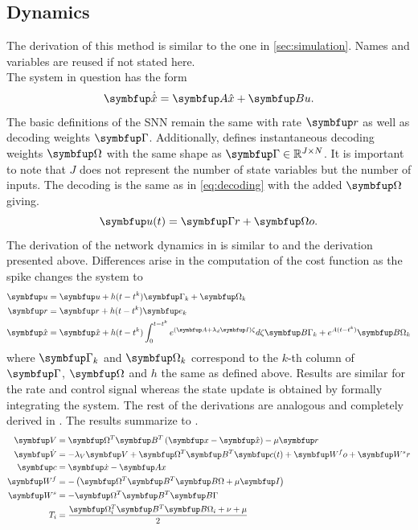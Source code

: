 \subsection{Dynamics}\label{ssec:control_dynamics}
The derivation of this method is similar to the one in \cref{sec:simulation}. Names and variables are reused if not stated here.\\
The system in question has the form
\begin{equation}\label{eq:contsys}
	\bmu{\dot{\hat{x}}} = \bmu{A\hat{x}} + \bmu{Bu}.
\end{equation}
The basic definitions of the \ac{SNN} remain the same with rate $\bmu{r}$ as well as decoding weights $\bmu{\Gamma}$. Additionally, \cite{huang_optimizing_2017} defines instantaneous decoding weights $\bmu{\Omega}$ with the same shape as $\bmu{\Gamma}\in \mathbb{R}^{J\times N}$. It is important to note that $J$ does not represent the number of state variables but the number of inputs. The decoding is the same as in \cref{eq:decoding} with the added $\bmu{\Omega}$ giving.
\begin{equation}\label{eq:control_signal_comp}
	\bmu{u}(t) = \bmu{\Gamma r} + \bmu{\Omega o}.
\end{equation}
The derivation of the network dynamics in \cite{huang_dynamics_2019} is similar to \cite{boerlin_predictive_2013} and the derivation presented above. Differences arise in the computation of the cost function as the spike changes the system to
\begin{equation}\label{eq:control_spike_change}
	\begin{aligned}
	\bmu{u} &= \bmu{u} + h(t-t^k)\bmu{\Gamma}_k + \bmu{\Omega}_k\\
	\bmu{r} &= \bmu{r} + h(t-t^k)\bmu{e}_k\\
	\bmu{\hat{x}} &= \bmu{\hat{x}} + h(t-t^k)\int_{0}^{t-t^k}e^{(\bmu{A}+\lambda_d\bmu{I})\zeta}d\zeta \bmu{B\Gamma}_k + e^{A(t-t^k)}\bmu{B\Omega}_k
	\end{aligned}
\end{equation}
where $\bmu{\Gamma}_k$ and $\bmu{\Omega}_k$ correspond to the $k$-th column of $\bmu{\Gamma}$, $\bmu{\Omega}$ and $h$ the same as defined above. Results are similar for the rate and control signal whereas the state update is obtained by formally integrating the system. The rest of the derivations are analogous and completely derived in \cite{huang_optimizing_2017}. The results summarize to .
\begin{align}
	\bmu{V} &= \bmu{\Omega}^T\bmu{B}^T\left(\bmu{x} -\bmu{\hat{x}}\right) - \mu \bmu{r}\label{eq:control_dyn_begin}\\
	\bmu{\dot{V}} &= -\lambda_V\bmu{V} + \bmu{\Omega}^T \bmu{B}^T \bmu{c}(t) + \bmu{W^fo} + \bmu{W^sr}\label{eq:control_dyn_2}\\
	\bmu{c} &= \bmu{\dot{x}} - \bmu{Ax}\\\label{eq:feeback_c}
	\bmu{W^f} &= - \left(\bmu{\Omega}^T\bmu{B}^T\bmu{B\Omega} + \mu\bmu{I}\right)\\
	\bmu{W^s} &= -\bmu{\Omega}^T\bmu{B}^T\bmu{B\Gamma}\label{eq:Ws_wrong}\\
	T_i &= \frac{\bmu{\Omega}_i^T\bmu{B}^T\bmu{B\Omega}_i + \nu  + \mu}{2}
	\label{eq:control_dyn_end}
\end{align}
